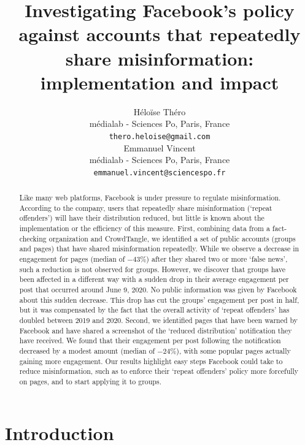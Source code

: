 \documentclass[11pt,a4paper]{article}
\title{Investigating Facebook's policy against accounts that repeatedly share misinformation: implementation and impact}
\author{Héloïse Théro \\
  médialab - Sciences Po, Paris, France \\
  \texttt{thero.heloise@gmail.com} \\\And
  Emmanuel Vincent \\
  médialab - Sciences Po, Paris, France \\
  \texttt{emmanuel.vincent@sciencespo.fr} \\}
\date{}
\begin{document}
\maketitle

\begin{abstract}
Like many web platforms, Facebook is under pressure to regulate misinformation. 
According to the company, users that repeatedly share misinformation (`repeat offenders') will have their distribution reduced, but little is known about the implementation or the efficiency of this measure.
First, combining data from a fact-checking organization and CrowdTangle, we identified a set of public accounts (groups and pages) that have shared misinformation repeatedly. 
While we observe a decrease in engagement for pages (median of $-43\%$) after they shared two or more `false news', such a reduction is not observed for groups. 
However, we discover that groups have been affected in a different way with a sudden drop in their average engagement per post that occurred around June 9, 2020.
No public information was given by Facebook about this sudden decrease.
This drop has cut the groups’ engagement per post in half, but it was compensated by the fact that the overall activity of `repeat offenders' has doubled between 2019 and 2020.
Second, we identified pages that have been warned by Facebook and have shared a screenshot of the `reduced distribution' notification they have received. 
We found that their engagement per post following the notification decreased by a modest amount (median of $-24\%$), with some popular pages actually gaining more engagement.
Our results highlight easy steps Facebook could take to reduce misinformation, such as to enforce their `repeat offenders' policy more forcefully on pages, and to start applying it to groups.
\end{abstract}

\section{Introduction}
\end{document}
